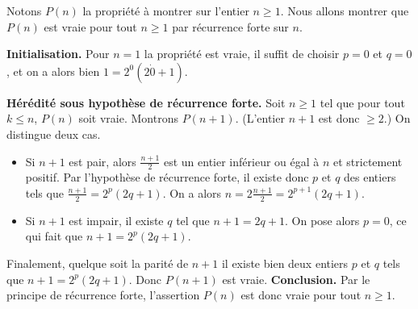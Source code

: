 \begin{Soln}{42}
Notons $P(n)$ la propriété à montrer sur l'entier $n\geq 1$. Nous allons montrer que $P(n)$ est vraie pour tout $n\geq 1$ par récurrence forte sur $n$.

\noindent\textbf{Initialisation.} Pour $n=1$ la propriété est vraie, il suffit de choisir $p=0$ et $q=0$, et on a alors bien $1=2^0(2\dot 0+1)$.

\noindent\textbf{Hérédité sous hypothèse de récurrence forte.}
Soit $n\geq 1$ tel que pour tout $k\leq n$, $P(n)$ soit vraie. Montrons $P(n+1)$. (L'entier $n+1$ est donc $\geq 2$.) On distingue deux cas.
\begin{itemize}
\item Si $n+1$ est pair, alors $\frac{n+1}{2}$ est un entier inférieur ou égal à $n$ et strictement positif. Par l'hypothèse de récurrence forte, il existe donc $p$ et $q$ des entiers tels que $\frac{n+1}{2} = 2^p(2q+1)$. On a alors $\boxed{n = 2\frac{n+1}{2} = 2^{p+1}(2q+1)}$.
\item Si $n+1$ est impair, il existe $q$ tel que $n+1 = 2q+1$. On pose alors $p=0$, ce qui fait que $n+1=2^p(2q+1)$.
\end{itemize}
Finalement, quelque soit la parité de $n+1$ il existe bien deux entiers $p$ et $q$ tels que $n+1=2^p(2q+1)$. Donc $P(n+1)$ est vraie.
\noindent\textbf{Conclusion.} Par le principe de récurrence forte, l'assertion $P(n)$ est donc vraie pour tout $n\geq 1$.
\end{Soln}
